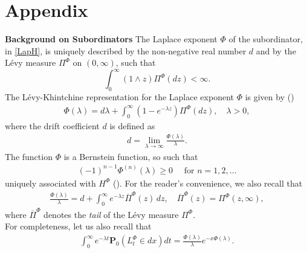 \documentclass[11pt,a4paper]{article}
\theoremstyle{definition}
\theoremstyle{remark}
\begin{document}
\section*{Appendix}
	\textbf{Background on Subordinators}
	The Laplace exponent \(\Phi\) of the subordinator, in \eqref{LapH}, is uniquely described by the non-negative real number \(d\) and by the L\'evy measure \(\Pi^\Phi\) on \((0, \infty)\), such that
	\[
	\int_0^\infty (1 \wedge z) \Pi^\Phi(dz) < \infty.
	\]
	The L\'evy-Khintchine representation for the Laplace exponent \(\Phi\) is given by (\cite[Theorem 3.2]{schilling2012bernstein})
	\begin{align}
		\label{LevKinFormula}
		\Phi(\lambda) =  d \lambda + \int_0^\infty (1 - e^{-\lambda z}) \Pi^\Phi(dz), \quad \lambda > 0,
	\end{align}
	where the drift coefficient \(d\) is defined as
	\begin{align*}
		d = \lim_{\lambda \to \infty} \frac{\Phi(\lambda)}{\lambda}.
	\end{align*}
	The function \(\Phi\) is a Bernstein function, so such that
	\begin{align*}
		(-1)^{n-1} \Phi^{(n)}(\lambda) \geq 0 \quad \text{ for } n = 1, 2, \ldots
	\end{align*}
	uniquely associated with \(H^\Phi\) (\cite[Theorem 5.2]{schilling2012bernstein}). For the reader's convenience, we also recall that
	\begin{align}
		\label{tailSymb}
		\frac{\Phi(\lambda)}{\lambda} = d + \int_0^\infty e^{-\lambda z} \overline{\Pi}^\Phi(z) \, dz, \quad \overline{\Pi}^\Phi(z) =  \Pi^\Phi(z, \infty),
	\end{align}
	where \(\overline{\Pi}^\Phi\) denotes the \textit{tail} of the L\'evy measure \(\Pi^\Phi\).\\
	For completeness, let us also recall that \cite[Formula (3.13)]{Meerschaert-triangular}
	\begin{align}
		\label{symbol:L}
		\int_{0}^\infty e^{-\lambda t} \mathbf{P}_0 (L_t^\Phi \in dx) dt = \frac{\Phi(\lambda)}{\lambda} e^{-x\Phi(\lambda)}.
	\end{align}
\end{document}
